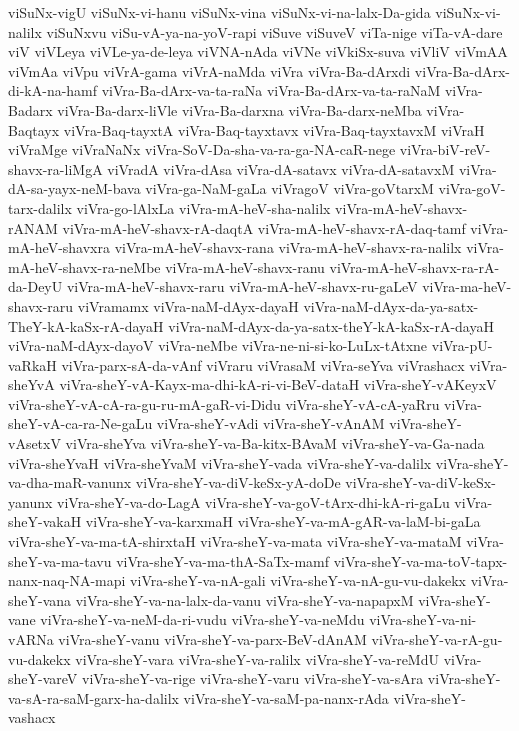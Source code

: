 {viSuNx-vigU
viSuNx-vi-hanu
viSuNx-vina
viSuNx-vi-na-lalx-Da-gida
viSuNx-vi-nalilx
viSuNxvu
viSu-vA-ya-na-yoV-rapi
viSuve
viSuveV
viTa-nige
viTa-vA-dare
viV
viVLeya
viVLe-ya-de-leya
viVNA-nAda
viVNe
viVkiSx-suva
viVliV
viVmAA
viVmAa
viVpu
viVrA-gama
viVrA-naMda
viVra
viVra-Ba-dArxdi
viVra-Ba-dArx-di-kA-na-hamf
viVra-Ba-dArx-va-ta-raNa
viVra-Ba-dArx-va-ta-raNaM
viVra-Badarx
viVra-Ba-darx-liVle
viVra-Ba-darxna
viVra-Ba-darx-neMba
viVra-Baqtayx
viVra-Baq-tayxtA
viVra-Baq-tayxtavx
viVra-Baq-tayxtavxM
viVraH
viVraMge
viVraNaNx
viVra-SoV-Da-sha-va-ra-ga-NA-caR-nege
viVra-biV-reV-shavx-ra-liMgA
viVradA
viVra-dAsa
viVra-dA-satavx
viVra-dA-satavxM
viVra-dA-sa-yayx-neM-bava
viVra-ga-NaM-gaLa
viVragoV
viVra-goVtarxM
viVra-goV-tarx-dalilx
viVra-go-lAlxLa
viVra-mA-heV-sha-nalilx
viVra-mA-heV-shavx-rANAM
viVra-mA-heV-shavx-rA-daqtA
viVra-mA-heV-shavx-rA-daq-tamf
viVra-mA-heV-shavxra
viVra-mA-heV-shavx-rana
viVra-mA-heV-shavx-ra-nalilx
viVra-mA-heV-shavx-ra-neMbe
viVra-mA-heV-shavx-ranu
viVra-mA-heV-shavx-ra-rA-da-DeyU
viVra-mA-heV-shavx-raru
viVra-mA-heV-shavx-ru-gaLeV
viVra-ma-heV-shavx-raru
viVramamx
viVra-naM-dAyx-dayaH
viVra-naM-dAyx-da-ya-satx-TheY-kA-kaSx-rA-dayaH
viVra-naM-dAyx-da-ya-satx-theY-kA-kaSx-rA-dayaH
viVra-naM-dAyx-dayoV
viVra-neMbe
viVra-ne-ni-si-ko-LuLx-tAtxne
viVra-pU-vaRkaH
viVra-parx-sA-da-vAnf
viVraru
viVrasaM
viVra-seYva
viVrashacx
viVra-sheYvA
viVra-sheY-vA-Kayx-ma-dhi-kA-ri-vi-BeV-dataH
viVra-sheY-vAKeyxV
viVra-sheY-vA-cA-ra-gu-ru-mA-gaR-vi-Didu
viVra-sheY-vA-cA-yaRru
viVra-sheY-vA-ca-ra-Ne-gaLu
viVra-sheY-vAdi
viVra-sheY-vAnAM
viVra-sheY-vAsetxV
viVra-sheYva
viVra-sheY-va-Ba-kitx-BAvaM
viVra-sheY-va-Ga-nada
viVra-sheYvaH
viVra-sheYvaM
viVra-sheY-vada
viVra-sheY-va-dalilx
viVra-sheY-va-dha-maR-vanunx
viVra-sheY-va-diV-keSx-yA-doDe
viVra-sheY-va-diV-keSx-yanunx
viVra-sheY-va-do-LagA
viVra-sheY-va-goV-tArx-dhi-kA-ri-gaLu
viVra-sheY-vakaH
viVra-sheY-va-karxmaH
viVra-sheY-va-mA-gAR-va-laM-bi-gaLa
viVra-sheY-va-ma-tA-shirxtaH
viVra-sheY-va-mata
viVra-sheY-va-mataM
viVra-sheY-va-ma-tavu
viVra-sheY-va-ma-thA-SaTx-mamf
viVra-sheY-va-ma-toV-tapx-nanx-naq-NA-mapi
viVra-sheY-va-nA-gali
viVra-sheY-va-nA-gu-vu-dakekx
viVra-sheY-vana
viVra-sheY-va-na-lalx-da-vanu
viVra-sheY-va-napapxM
viVra-sheY-vane
viVra-sheY-va-neM-da-ri-vudu
viVra-sheY-va-neMdu
viVra-sheY-va-ni-vARNa
viVra-sheY-vanu
viVra-sheY-va-parx-BeV-dAnAM
viVra-sheY-va-rA-gu-vu-dakekx
viVra-sheY-vara
viVra-sheY-va-ralilx
viVra-sheY-va-reMdU
viVra-sheY-vareV
viVra-sheY-va-rige
viVra-sheY-varu
viVra-sheY-va-sAra
viVra-sheY-va-sA-ra-saM-garx-ha-dalilx
viVra-sheY-va-saM-pa-nanx-rAda
viVra-sheY-vashacx
}
